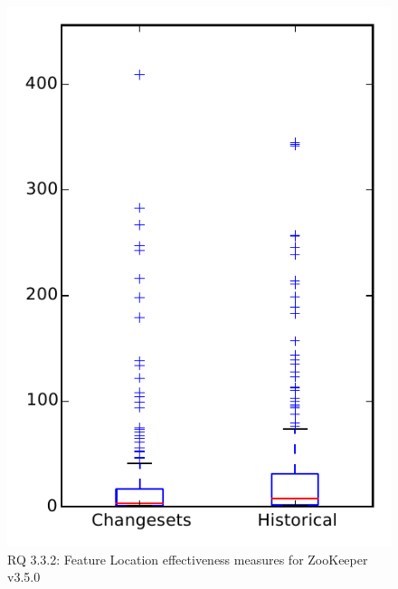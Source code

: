 
\begin{figure}
\centering
\includegraphics[height=0.4\textheight]{figures/flt/rq2_zookeeper}
\caption{RQ 3.3.2: Feature Location effectiveness measures for ZooKeeper v3.5.0}
\label{fig:flt:rq2:zookeeper}
\end{figure}

